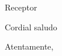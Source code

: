 \documentclass[letterpaper,spanish,11pt]{letter}
\begin{document}
\begin{letter}{Receptor}
	
\opening{Cordial saludo}



\closing{Atentamente,}


\end{letter}
\end{document}
